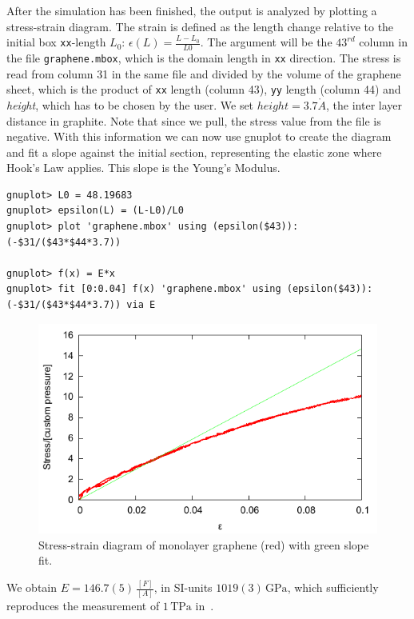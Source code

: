 After the simulation has been finished, the output is analyzed by plotting a
stress-strain diagram. The strain is defined as the length change relative to
the initial box \texttt{xx}-length $L_0$: $\epsilon(L) = \frac{L-L_0}{L0}$.
The argument will be the $43^{rd}$ column in the file \texttt{graphene.mbox}, which
is the domain length in \texttt{xx} direction. The stress is read
from column 31 in the same file and divided by the volume of the graphene sheet, which is the product of
\texttt{xx} length (column 43), \texttt{yy} length (column 44) and
\textit{height}, which has to be chosen by the user. We set $height=3.7
\mathring{A}$, the inter layer distance in graphite. Note that since we pull,
the stress value from the file is negative. With this information we can now
use gnuplot to create the diagram and fit a slope against the initial
section, representing the elastic zone where Hook's Law applies. This slope is
the Young's Modulus.

\begin{lstlisting}
gnuplot> L0 = 48.19683
gnuplot> epsilon(L) = (L-L0)/L0
gnuplot> plot 'graphene.mbox' using (epsilon($43)):(-$31/($43*$44*3.7))

gnuplot> f(x) = E*x
gnuplot> fit [0:0.04] f(x) 'graphene.mbox' using (epsilon($43)):(-$31/($43*$44*3.7)) via E
\end{lstlisting}

\begin{figure}[h]
    \centering
    \includegraphics{visuals/graphene.pdf}
    \caption{Stress-strain diagram of monolayer graphene (red) with green slope fit.}
\end{figure}

We obtain $E=146.7(5)\,\frac{[F]}{[A]}$, in SI-units $1019(3)\,\textrm{GPa}$, which
sufficiently reproduces the measurement of $1\,\textrm{TPa}$ in~\cite{egraphene}.

